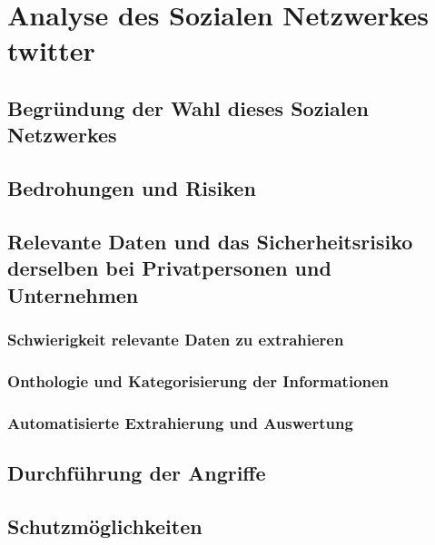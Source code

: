 \chapter{Analyse des Sozialen Netzwerkes \glqq{}twitter\grqq{}}
\label{chapter:analyse}

\section{Begründung der Wahl dieses Sozialen Netzwerkes}
\section{Bedrohungen und Risiken}
\section{Relevante Daten und das Sicherheitsrisiko derselben bei Privatpersonen
und Unternehmen}
\subsection{Schwierigkeit relevante Daten zu extrahieren}
\subsection{Onthologie und Kategorisierung der Informationen}
\subsection{Automatisierte Extrahierung und Auswertung}
\section{Durchführung der Angriffe}
\section{Schutzmöglichkeiten}
